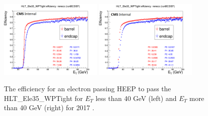 \begin{figure}[h!]
\begin{center}
\includegraphics[width=0.45\textwidth]{figures/Zprime/2017/trigger/eff_Ele35_part1.png}
\includegraphics[width=0.45\textwidth]{figures/Zprime/2017/trigger/eff_Ele35_part2.png}
\caption{The efficiency for an electron passing HEEP to pass the HLT\_Ele35\_WPTight for $E_{T}$ less than 40 GeV (left) and $E_{T}$ more than 40 GeV (right) for 2017 \cite{CMS-AN-2018-021}.}
\label{fig:Ele35_2017}
\end{center}
\end{figure}
